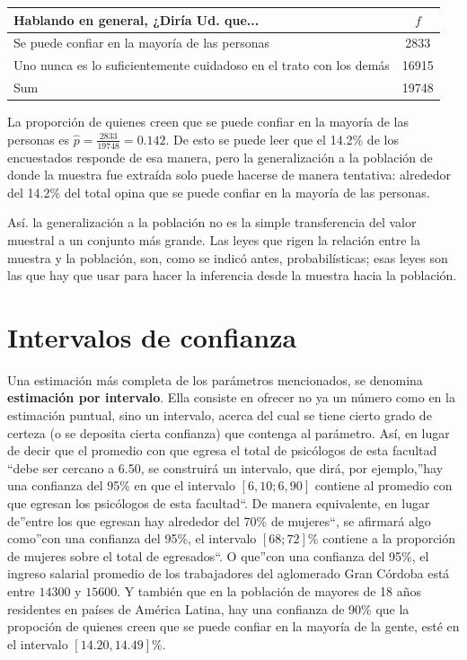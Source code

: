 \documentclass[]{book}
\begin{document}
\begin{table}[H]
\centering
\begin{tabular}{lc}
\toprule
Hablando en general, ¿Diría Ud. que... & $f$\\
\midrule
\rowcolor{gray!6}  Se puede confiar en la mayoría de las personas & 2833\\
Uno nunca es lo suficientemente cuidadoso en el trato con los demás & 16915\\
\rowcolor{gray!6}  Sum & 19748\\
\bottomrule
\end{tabular}
\end{table}

La proporción de quienes creen que se puede confiar en la mayoría de las personas es \(\widehat{p}=\frac{2833}{19748}= 0.142\). De esto se puede leer que el 14.2\% de los encuestados responde de esa manera, pero la generalización a la población de donde la muestra fue extraída solo puede hacerse de manera tentativa: alrededor del 14.2\% del total opina que se puede confiar en la mayoría de las personas.

Así. la generalización a la población no es la simple transferencia del valor muestral a un conjunto más grande. Las leyes que rigen la relación entre la muestra y la población, son, como se indicó antes, probabilísticas; esas leyes son las que hay que usar para hacer la inferencia desde la muestra hacia la población.

\hypertarget{intervalos-de-confianza}{%
\section{Intervalos de confianza}\label{intervalos-de-confianza}}

Una estimación más completa de los parámetros mencionados, se denomina
\textbf{estimación por intervalo}. Ella consiste en ofrecer no ya un número
como en la estimación puntual, sino un intervalo, acerca del cual se
tiene cierto grado de certeza (o se deposita cierta confianza) que
contenga al parámetro. Así, en lugar de decir que el promedio con que
egresa el total de psicólogos de esta facultad ``debe ser cercano a 6.50, se
construirá un intervalo, que dirá, por ejemplo,''hay una confianza del
95\% en que el intervalo \([6,10; 6,90]\) contiene al promedio con que
egresan los psicólogos de esta facultad``. De manera equivalente, en
lugar de''entre los que egresan hay alrededor del 70\% de mujeres``, se
afirmará algo como''con una confianza del 95\%, el intervalo \([68; 72]\)\%
contiene a la proporción de mujeres sobre el total de egresados``. O que''con una confianza del 95\%, el ingreso salarial promedio de los trabajadores del aglomerado Gran Córdoba está entre \(14300\) y \(15600\). Y también que en la población de mayores de 18 años residentes en países de América Latina, hay una confianza de 90\% que la propoción de quienes creen que se puede confiar en la mayoría de la gente, esté en el intervalo \([14.20, 14.49]\)\%.
\end{document}

